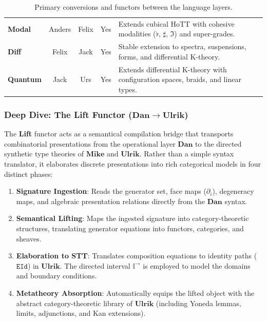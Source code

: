 \documentclass{article}
\theoremstyle{definition}
\theoremstyle{plain}
\begin{document}
\begin{table}[ht]
{\begin{tabular}{|l|c|c|l|p{9cm}|}
\textbf{Modal} & Anders & Felix & Yes & Extends cubical HoTT with cohesive modalities ($\flat$, $\sharp$, $\Im$) and super-grades. \\
\textbf{Diff} & Felix & Jack & Yes & Stable extension to spectra, suspensions, forms, and differential K-theory. \\
\textbf{Quantum} & Jack & Urs & Yes & Extends differential K-theory with configuration spaces, braids, and linear types. \\
\hline
\end{tabular}%
}
\caption{Primary conversions and functors between the language layers.}
\label{tab:functors}
\end{table}

\newpage

\subsubsection{Deep Dive: The Lift Functor
(\texorpdfstring{$\mathbf{Dan} \to \mathbf{Ulrik}$}{Dan -> Ulrik})}

The \textbf{Lift} functor acts as a semantical compilation bridge that transports combinatorial presentations from
the operational layer $\mathbf{Dan}$ to the directed synthetic type theories of $\mathbf{Mike}$ and $\mathbf{Ulrik}$.
Rather than a simple syntax translator, it elaborates discrete presentations into rich categorical models in four distinct phases:

\begin{enumerate}
    \item \textbf{Signature Ingestion}: Reads the generator set, face maps ($\partial_i$), degeneracy maps, and algebraic presentation relations directly from the $\mathbf{Dan}$ syntax.
    \item \textbf{Semantical Lifting}: Maps the ingested signature into category-theoretic structures, translating generator equations into functors, categories, and sheaves.
    \item \textbf{Elaboration to STT}: Translates composition equations to identity paths ($\mathtt{EId}$) in $\mathbf{Ulrik}$. The directed interval $\mathbb{I}^{\to}$ is employed to model the domains and boundary conditions.
    \item \textbf{Metatheory Absorption}: Automatically equips the lifted object with the abstract category-theoretic library of $\mathbf{Ulrik}$ (including Yoneda lemmas, limits, adjunctions, and Kan extensions).
\end{enumerate}
\end{document}

